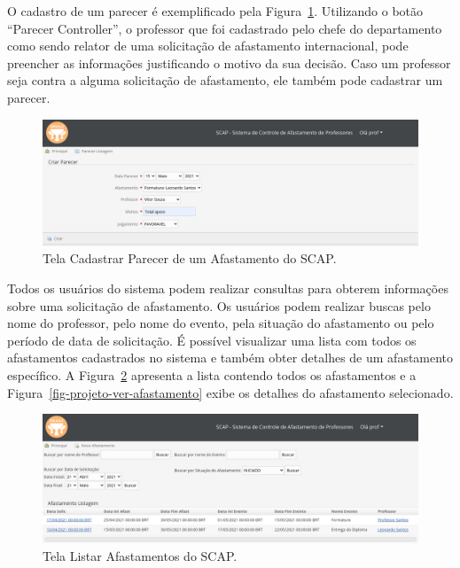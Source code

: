 O cadastro de um parecer é exemplificado pela Figura~\ref{fig-projeto-cadastrar-parecer}. Utilizando o botão ``Parecer Controller'', o professor que foi cadastrado pelo chefe do departamento como sendo relator de uma solicitação de afastamento internacional, pode preencher as informações justificando o motivo da sua decisão. Caso um professor seja contra a alguma solicitação de afastamento, ele também pode cadastrar um parecer. 

\begin{figure}[!h]
	\centering
	\includegraphics[scale=0.33]{figuras/fig-projeto-cadastrar-parecer} 
	\caption{Tela Cadastrar Parecer de um Afastamento do SCAP.}
	\label{fig-projeto-cadastrar-parecer}
\end{figure}

Todos os usuários do sistema podem realizar consultas para obterem informações sobre uma solicitação de afastamento. Os usuários podem realizar buscas pelo nome do professor, pelo nome do evento, pela situação do afastamento ou pelo período de data de solicitação. É possível visualizar uma lista com todos os afastamentos cadastrados no sistema e também obter detalhes de um afastamento específico. A Figura~\ref{fig-projeto-listar-afastamentos} apresenta a lista contendo todos os afastamentos e a Figura~\ref{fig-projeto-ver-afastamento} exibe os detalhes do afastamento selecionado.  

\begin{figure}[!h]
	\centering
	\includegraphics[scale=0.33]{figuras/fig-projeto-listar-afastamentos} 
	\caption{Tela Listar Afastamentos do SCAP.}
	\label{fig-projeto-listar-afastamentos}
\end{figure}

